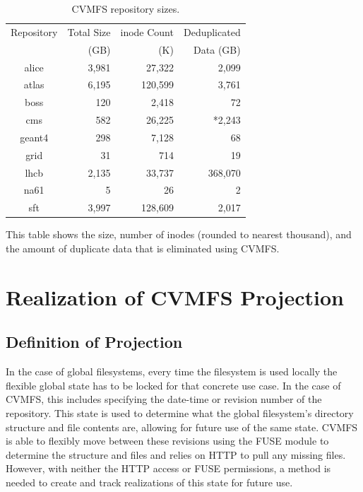 \documentclass[sigconf]{acmart}
\begin{document}
\fi

\begin{table}
\begin{center}
\begin{tabular}{|c|r r r|}
\hline
Repository & Total Size & inode Count & Deduplicated \\
 & (GB) & (K) & Data (GB) \\ \hline
alice & 3,981 & 27,322 & 2,099 \\
atlas & 6,195 & 120,599 & 3,761 \\
boss & 120 & 2,418 & 72\\
cms & 582 & 26,225 & *2,243\\
geant4 & 298 & 7,128 & 68 \\
grid & 31 & 714 & 19 \\
lhcb & 2,135 & 33,737 & 368,070 \\
na61 & 5 & 26 & 2 \\
sft & 3,997 & 128,609 & 2,017 \\ 
 \hline
\end{tabular}
\caption{CVMFS repository sizes.}
\label{tab:repo-sizes}
This table shows the size, number of inodes (rounded to nearest thousand), and the amount
of duplicate data that is eliminated using CVMFS.
\end{center}
\end{table}

\section{Realization of CVMFS Projection}

\subsection{Definition of Projection}

In the case of global filesystems,
every time the filesystem is used locally
the flexible global state has to be 
locked for that concrete use case.
In the case of CVMFS,
this includes specifying the date-time
or revision number of the repository.
This state is used to determine 
what the global filesystem's directory
structure and file contents are, 
allowing for future use of the same state.
CVMFS is able to flexibly move
between these revisions using the FUSE module
to determine the structure and files and
relies on HTTP to pull any missing files.
However, with neither the HTTP access or
FUSE permissions, a method is needed to 
create and track realizations of this
state for future use.
\end{document}
